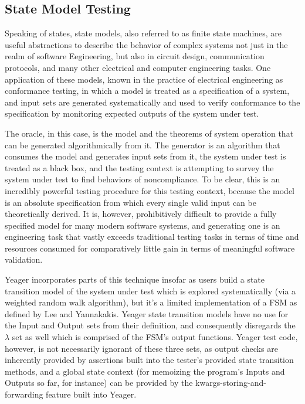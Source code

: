 \subsection{State Model Testing}
Speaking of states, state models, also referred to as finite state machines, are useful abstractions to describe the behavior of complex systems not just in the realm of software Eegineering, but also in circuit design, communication protocols, and many other electrical and computer engineering tasks. One application of these models, known in the practice of electrical engineering as conformance testing, in which a model is treated as a specification of a system, and input sets are generated systematically and used to verify conformance to the specification by monitoring expected outputs of the system under test.\citep{lee1996principles}

The oracle, in this case, is the model and the theorems of system operation that can be generated algorithmically from it. The generator is an algorithm that consumes the model and generates input sets from it, the system under test is treated as a black box, and the testing context is attempting to survey the system under test to find behaviors of noncompliance. To be clear, this is an incredibly powerful testing procedure for this testing context, because the model is an absolute specification from which every single valid input can be theoretically derived. It is, however, prohibitively difficult to provide a fully specified model for many modern software systems, and generating one is an engineering task that vastly exceeds traditional testing tasks in terms of time and resources consumed for comparatively little gain in terms of meaningful software validation.

Yeager incorporates parts of this technique insofar as users build a state transition model of the system under test which is explored systematically (via a weighted random walk algorithm), but it's a limited implementation of a FSM as defined by Lee and Yannakakis. Yeager state transition models have no use for the Input and Output sets from their definition, and consequently disregards the $\lambda$ set as well which is comprised of the FSM's output functions. Yeager test code, however, is not necessarily ignorant of these three sets, as output checks are inherently provided by assertions built into the tester's provided state transition methods, and a global state context (for memoizing the program's Inputs and Outputs so far, for instance) can be provided by the kwargs-storing-and-forwarding feature built into Yeager.

